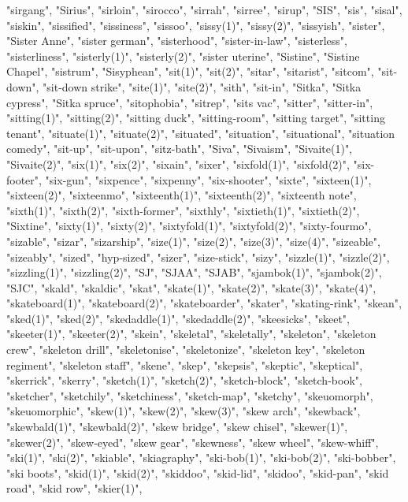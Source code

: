 "sirgang",
"Sirius",
"sirloin",
"sirocco",
"sirrah",
"sirree",
"sirup",
"SIS",
"sis",
"sisal",
"siskin",
"sissified",
"sissiness",
"sissoo",
"sissy(1)",
"sissy(2)",
"sissyish",
"sister",
"Sister Anne",
"sister german",
"sisterhood",
"sister-in-law",
"sisterless",
"sisterliness",
"sisterly(1)",
"sisterly(2)",
"sister uterine",
"Sistine",
"Sistine Chapel",
"sistrum",
"Sisyphean",
"sit(1)",
"sit(2)",
"sitar",
"sitarist",
"sitcom",
"sit-down",
"sit-down strike",
"site(1)",
"site(2)",
"sith",
"sit-in",
"Sitka",
"Sitka cypress",
"Sitka spruce",
"sitophobia",
"sitrep",
"sits vac",
"sitter",
"sitter-in",
"sitting(1)",
"sitting(2)",
"sitting duck",
"sitting-room",
"sitting target",
"sitting tenant",
"situate(1)",
"situate(2)",
"situated",
"situation",
"situational",
"situation comedy",
"sit-up",
"sit-upon",
"sitz-bath",
"Siva",
"Sivaism",
"Sivaite(1)",
"Sivaite(2)",
"six(1)",
"six(2)",
"sixain",
"sixer",
"sixfold(1)",
"sixfold(2)",
"six-footer",
"six-gun",
"sixpence",
"sixpenny",
"six-shooter",
"sixte",
"sixteen(1)",
"sixteen(2)",
"sixteenmo",
"sixteenth(1)",
"sixteenth(2)",
"sixteenth note",
"sixth(1)",
"sixth(2)",
"sixth-former",
"sixthly",
"sixtieth(1)",
"sixtieth(2)",
"Sixtine",
"sixty(1)",
"sixty(2)",
"sixtyfold(1)",
"sixtyfold(2)",
"sixty-fourmo",
"sizable",
"sizar",
"sizarship",
"size(1)",
"size(2)",
"size(3)",
"size(4)",
"sizeable",
"sizeably",
"sized",
"hyp-sized",
"sizer",
"size-stick",
"sizy",
"sizzle(1)",
"sizzle(2)",
"sizzling(1)",
"sizzling(2)",
"SJ",
"SJAA",
"SJAB",
"sjambok(1)",
"sjambok(2)",
"SJC",
"skald",
"skaldic",
"skat",
"skate(1)",
"skate(2)",
"skate(3)",
"skate(4)",
"skateboard(1)",
"skateboard(2)",
"skateboarder",
"skater",
"skating-rink",
"skean",
"sked(1)",
"sked(2)",
"skedaddle(1)",
"skedaddle(2)",
"skeesicks",
"skeet",
"skeeter(1)",
"skeeter(2)",
"skein",
"skeletal",
"skeletally",
"skeleton",
"skeleton crew",
"skeleton drill",
"skeletonise",
"skeletonize",
"skeleton key",
"skeleton regiment",
"skeleton staff",
"skene",
"skep",
"skepsis",
"skeptic",
"skeptical",
"skerrick",
"skerry",
"sketch(1)",
"sketch(2)",
"sketch-block",
"sketch-book",
"sketcher",
"sketchily",
"sketchiness",
"sketch-map",
"sketchy",
"skeuomorph",
"skeuomorphic",
"skew(1)",
"skew(2)",
"skew(3)",
"skew arch",
"skewback",
"skewbald(1)",
"skewbald(2)",
"skew bridge",
"skew chisel",
"skewer(1)",
"skewer(2)",
"skew-eyed",
"skew gear",
"skewness",
"skew wheel",
"skew-whiff",
"ski(1)",
"ski(2)",
"skiable",
"skiagraphy",
"ski-bob(1)",
"ski-bob(2)",
"ski-bobber",
"ski boots",
"skid(1)",
"skid(2)",
"skiddoo",
"skid-lid",
"skidoo",
"skid-pan",
"skid road",
"skid row",
"skier(1)",
